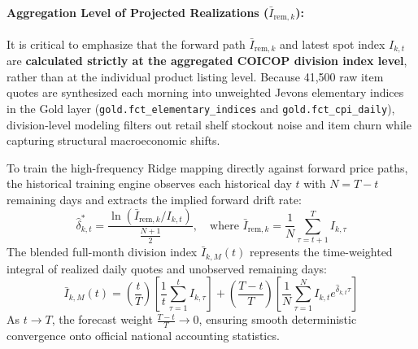 \paragraph{Aggregation Level of Projected Realizations ($\bar{I}_{\text{rem}, k}$):}
It is critical to emphasize that the forward path $\bar{I}_{\text{rem}, k}$ and latest spot index $I_{k, t}$ are \textbf{calculated strictly at the aggregated COICOP division index level}, rather than at the individual product listing level. Because 41,500 raw item quotes are synthesized each morning into unweighted Jevons elementary indices in the Gold layer (\texttt{gold.fct\_elementary\_indices} and \texttt{gold.fct\_cpi\_daily}), division-level modeling filters out retail shelf stockout noise and item churn while capturing structural macroeconomic shifts.

\hs To train the high-frequency Ridge mapping directly against forward price paths, the historical training engine observes each historical day $t$ with $N = T - t$ remaining days and extracts the implied forward drift rate:
\begin{equation}
    \hat{\delta}_{k, t}^* = \frac{\ln\left( \bar{I}_{\text{rem}, k} / I_{k, t} \right)}{\frac{N + 1}{2}}, \quad \text{where } \bar{I}_{\text{rem}, k} = \frac{1}{N} \sum_{\tau=t+1}^T I_{k, \tau}
\end{equation}
The blended full-month division index $\bar{I}_{k, M}(t)$ represents the time-weighted integral of realized daily quotes and unobserved remaining days:
\begin{equation}
    \bar{I}_{k, M}(t) = \left( \frac{t}{T} \right) \left[ \frac{1}{t}\sum_{\tau=1}^t I_{k, \tau} \right] + \left( \frac{T - t}{T} \right) \left[ \frac{1}{N} \sum_{\tau=1}^N I_{k, t} e^{\hat{\delta}_{k, t} \tau} \right]
\end{equation}
As $t \to T$, the forecast weight $\frac{T-t}{T} \to 0$, ensuring smooth deterministic convergence onto official national accounting statistics.

